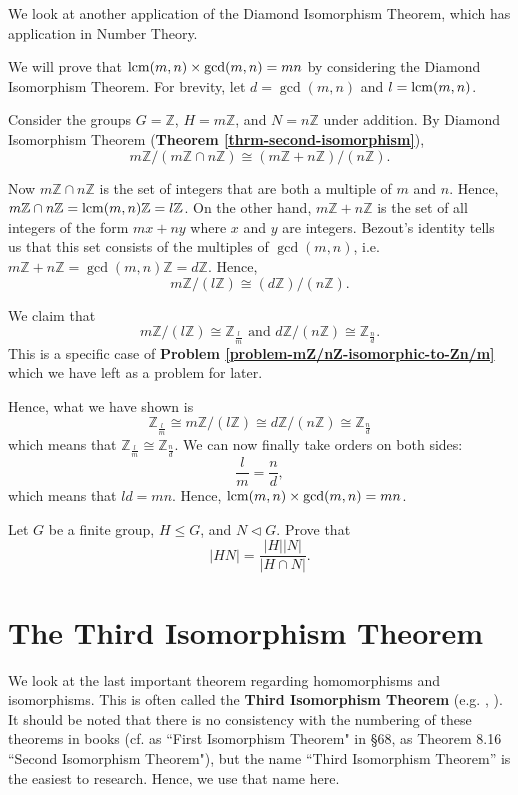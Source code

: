 We look at another application of the Diamond Isomorphism Theorem, which has application in Number Theory.
\begin{example}
    We will prove that $\mathrm{lcm}(m,n)\times\gcd(m,n) = mn$ by considering the Diamond Isomorphism Theorem. For brevity, let $d = \gcd(m,n)$ and $l = \mathrm{lcm}(m,n)$.

    Consider the groups $G = \mathbb{Z}$, $H = m\mathbb{Z}$, and $N = n\mathbb{Z}$ under addition. By Diamond Isomorphism Theorem (\textbf{Theorem \ref{thrm-second-isomorphism}}),
    \[
        m\mathbb{Z}/(m\mathbb{Z} \cap n\mathbb{Z}) \cong (m\mathbb{Z} + n\mathbb{Z})/(n\mathbb{Z}).
    \]

    Now $m\mathbb{Z} \cap n\mathbb{Z}$ is the set of integers that are both a multiple of $m$ and $n$. Hence, $m\mathbb{Z} \cap n\mathbb{Z} = \mathrm{lcm}(m,n)\mathbb{Z} = l\mathbb{Z}$. On the other hand, $m\mathbb{Z} + n\mathbb{Z}$ is the set of all integers of the form $mx+ny$ where $x$ and $y$ are integers. Bezout's identity tells us that this set consists of the multiples of $\gcd(m,n)$, i.e. $m\mathbb{Z} + n\mathbb{Z} = \gcd(m,n)\mathbb{Z} = d\mathbb{Z}$. Hence,
    \[
        m\mathbb{Z}/(l\mathbb{Z}) \cong (d\mathbb{Z})/(n\mathbb{Z}).
    \]

    We claim that
    \[
        m\mathbb{Z} / (l\mathbb{Z}) \cong \mathbb{Z}_{\frac lm} \text{ and } d\mathbb{Z} / (n\mathbb{Z}) \cong \mathbb{Z}_{\frac nd}.
    \]
    This is a specific case of \textbf{Problem \ref{problem-mZ/nZ-isomorphic-to-Zn/m}} which we have left as a problem for later.

    Hence, what we have shown is
    \[
    \mathbb{Z}_{\frac lm} \cong m\mathbb{Z}/(l\mathbb{Z}) \cong d\mathbb{Z}/(n\mathbb{Z}) \cong \mathbb{Z}_{\frac nd}
    \]
    which means that $\mathbb{Z}_{\frac lm} \cong \mathbb{Z}_{\frac nd}$. We can now finally take orders on both sides:
    \[
        \frac{l}{m} = \frac{n}{d},
    \]
    which means that $ld = mn$. Hence, $\mathrm{lcm}(m,n)\times\gcd(m,n) = mn$.
\end{example}

\begin{exercise}\label{exercise-order-of-subgroup-product}
    Let $G$ be a finite group, $H \leq G$, and $N \lhd G$. Prove that
    \[
        |HN| = \frac{|H||N|}{|H \cap N|}.
    \]
\end{exercise}

\newpage

\section{The Third Isomorphism Theorem}
We look at the last important theorem regarding homomorphisms and isomorphisms. This is often called the \textbf{Third Isomorphism Theorem} (e.g. \cite{cohn_1982}, \cite{hungerford_1980}). It should be noted that there is no consistency with the numbering of these theorems in books (cf. \cite{clark_1984} as ``First Isomorphism Theorem" in \S 68, \cite{humphreys_1996} as Theorem 8.16 ``Second Isomorphism Theorem"), but the name ``Third Isomorphism Theorem'' is the easiest to research. Hence, we use that name here.

